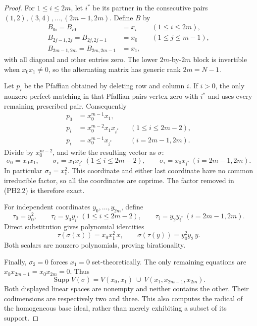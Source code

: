 \begin{proof}
For \(1\le i\le2m\), let \(i^*\) be its partner in the consecutive
pairs \((1,2),(3,4),\ldots,(2m-1,2m)\).  Define \(B\) by
\[
 \begin{aligned}
 B_{0i}=B_{i0}&=x_i &&(1\le i\le2m),\\
 B_{2j-1,2j}=B_{2j,2j-1}&=x_0 &&(1\le j\le m-1),\\
 B_{2m-1,2m}=B_{2m,2m-1}&=x_1,
 \end{aligned}                                                   \tag{PH2.1}
\]
with all diagonal and other entries zero.  The lower \(2m\)-by-\(2m\)
block is invertible when \(x_0x_1\ne0\), so the alternating matrix
has generic rank \(2m=N-1\).

Let \(p_i\) be the Pfaffian obtained by deleting row and column \(i\).
If \(i>0\), the only nonzero perfect matching in that Pfaffian pairs
vertex zero with \(i^*\) and uses every remaining prescribed pair.
Consequently
\[
 \begin{aligned}
 p_0&=x_0^{m-1}x_1,\\
 p_i&=x_0^{m-2}x_1x_{i^*}
                  &&(1\le i\le2m-2),\\
 p_i&=x_0^{m-1}x_{i^*}
                  &&(i=2m-1,2m).
 \end{aligned}                                                   \tag{PH2.2}
\]
Divide by \(x_0^{m-2}\), and write the resulting vector as \(\sigma\):
\[
 \sigma_0=x_0x_1,\qquad
 \sigma_i=x_1x_{i^*}\ (1\le i\le2m-2),\qquad
 \sigma_i=x_0x_{i^*}\ (i=2m-1,2m).                               \tag{PH2.3}
\]
In particular \(\sigma_2=x_1^2\).  This coordinate and either last
coordinate have no common irreducible factor, so all the coordinates
are coprime.  The factor removed in (PH2.2) is therefore exact.

For independent coordinates \(y_0,\ldots,y_{2m}\), define
\[
 \tau_0=y_0^2,\qquad
 \tau_i=y_0y_{i^*}\ (1\le i\le2m-2),\qquad
 \tau_i=y_2y_{i^*}\ (i=2m-1,2m).                                \tag{PH2.4}
\]
Direct substitution gives polynomial identities
\[
       \tau(\sigma(x))=x_0x_1^2\,x,\qquad
       \sigma(\tau(y))=y_0^2y_2\,y.                              \tag{PH2.5}
\]
Both scalars are nonzero polynomials, proving birationality.

Finally, \(\sigma_2=0\) forces \(x_1=0\) set-theoretically.  The
only remaining equations are \(x_0x_{2m-1}=x_0x_{2m}=0\).  Thus
\[
 \operatorname{Supp}V(\sigma)=
 V(x_0,x_1)\ \cup\ V(x_1,x_{2m-1},x_{2m}).                       \tag{PH2.6}
\]
Both displayed linear spaces are nonempty and neither contains the
other.  Their codimensions are respectively two and three.  This
also computes the radical of the homogeneous base ideal, rather
than merely exhibiting a subset of its support.
\end{proof}

